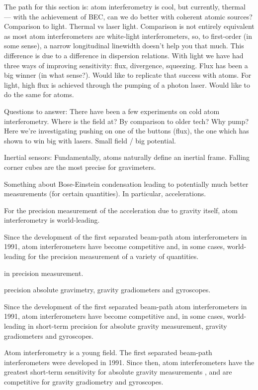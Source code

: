 The path for this section is: atom interferometry is cool, but currently, thermal --- with the achievement of BEC, can we do better with coherent atomic sources?  Comparison to light. Thermal vs laser light.  Comparison is not entirely equivalent as most atom interferometers are white-light interferometers, so, to first-order (in some sense), a narrow longitudinal linewidth doesn't help you that much.  This difference is due to a difference in dispersion relations.  With light we have had three ways of improving sensitivity: flux, divergence, squeezing.  Flux has been a big winner (in what sense?).  Would like to replicate that success with atoms.  For light, high flux is achieved through the pumping of a photon laser.  Would like to do the same for atoms.

Questions to answer:
There have been a few experiments on cold atom interferometry.  Where is the field at?  By comparison to older tech?  Why pump?  Here we're investigating pushing on one of the buttons (flux), the one which has shown to win big with lasers.  Small field / big potential.

Inertial sensors:  Fundamentally, atoms naturally define an inertial frame.  Falling corner cubes are the most precise for gravimeters.



Something about Bose-Einstein condensation leading to potentially much better measurements (for certain quantities).  In particular, accelerations.


For the precision measurement of the acceleration due to gravity itself, atom interferometry is world-leading.  

Since the development of the first separated beam-path atom interferometers in 1991, atom interferometers have become competitive and, in some cases, world-leading for the precision measurement of a variety of quantities.

in precision measurement.

precision absolute gravimetry, gravity gradiometers and gyroscopes.


Since the development of the first separated beam-path atom interferometers in 1991, atom interferometers have become competitive and, in some cases, world-leading in short-term precision for absolute gravity measurement, gravity gradiometers and gyroscopes.



Atom interferometry is a young field.  The first separated beam-path interferometers were developed in 1991.  Since then, atom interferometers have the greatest short-term sensitivity for absolute gravity measurements \citep{Muller:2008}, and are competitive for gravity gradiometry and gyroscopes.

